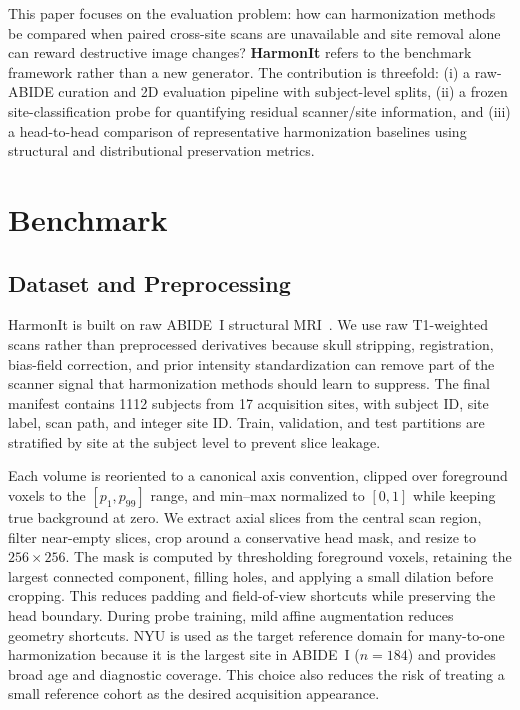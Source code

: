 \documentclass{article}
\begin{document}
This paper focuses on the evaluation problem: how can harmonization methods be compared when paired cross-site scans are unavailable and site removal alone can reward destructive image changes? \textbf{HarmonIt} refers to the benchmark framework rather than a new generator. The contribution is threefold: (i) a raw-ABIDE curation and 2D evaluation pipeline with subject-level splits, (ii) a frozen site-classification probe for quantifying residual scanner/site information, and (iii) a head-to-head comparison of representative harmonization baselines using structural and distributional preservation metrics.

\section{Benchmark}
\subsection{Dataset and Preprocessing}
HarmonIt is built on raw ABIDE~I structural MRI~\cite{dimartino2014abide}. We use raw T1-weighted scans rather than preprocessed derivatives because skull stripping, registration, bias-field correction, and prior intensity standardization can remove part of the scanner signal that harmonization methods should learn to suppress. The final manifest contains 1112 subjects from 17 acquisition sites, with subject ID, site label, scan path, and integer site ID. Train, validation, and test partitions are stratified by site at the subject level to prevent slice leakage.

Each volume is reoriented to a canonical axis convention, clipped over foreground voxels to the $[p_1,p_{99}]$ range, and min--max normalized to $[0,1]$ while keeping true background at zero. We extract axial slices from the central scan region, filter near-empty slices, crop around a conservative head mask, and resize to $256\times256$. The mask is computed by thresholding foreground voxels, retaining the largest connected component, filling holes, and applying a small dilation before cropping. This reduces padding and field-of-view shortcuts while preserving the head boundary. During probe training, mild affine augmentation reduces geometry shortcuts. NYU is used as the target reference domain for many-to-one harmonization because it is the largest site in ABIDE~I ($n=184$) and provides broad age and diagnostic coverage. This choice also reduces the risk of treating a small reference cohort as the desired acquisition appearance.
\end{document}
